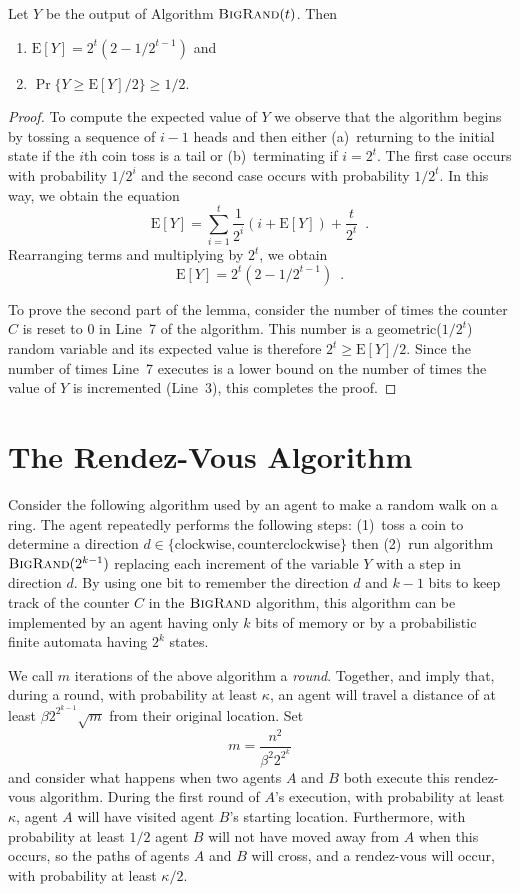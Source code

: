 \documentclass[lotsofwhite]{patmorin}
\newcommand{\bigrand}{\textsc{BigRand}}
\newcommand{\E}{\mathrm{E}}
\begin{document}
\begin{lem}
Let $Y$ be the output of Algorithm $\bigrand(t)$.  Then 
\begin{enumerate}
\item $\E[Y]=2^t(2-1/2^{t-1})$ and
\item $\Pr\{Y \ge \E[Y] / 2\} \ge 1/2$.
\end{enumerate}
\end{lem}

\begin{proof}
To compute the expected value of $Y$ we observe that the algorithm
begins by tossing a sequence of $i-1$ heads and then either
(a)~returning to the initial state if the $i$th coin toss is a tail
or (b)~terminating if $i=2^t$.  The first case occurs with probability
$1/2^i$ and the second case occurs with probability $1/2^t$.
In this way, we obtain the equation
\[
   \E[Y] = \sum_{i=1}^{t} \frac{1}{2^i}\left(i + \E[Y]\right) +
\frac{t}{2^t} \enspace .
\]
Rearranging terms and multiplying by $2^{t}$, we obtain
\[
   \E[Y] = 2^t(2-1/2^{t-1}) \enspace .  
\]

To prove the second part of the lemma, consider the number of times
the counter $C$ is reset to $0$ in Line~7 of the algorithm.  This
number is a geometric($1/2^t$) random variable and its expected value
is therefore $2^t \ge \E[Y]/2$.  Since the number of times Line~7
executes is a lower bound on the number of times the value of $Y$ is
incremented (Line~3), this completes the proof.
\end{proof}

\section{The Rendez-Vous Algorithm}

Consider the following algorithm used by an agent to make a random
walk on a ring.  The agent repeatedly performs the following steps:
(1)~toss a coin to determine a direction
$d\in\{\mbox{clockwise},\mbox{counterclockwise}\}$ then (2)~run
algorithm $\bigrand(2^{k-1})$ replacing each increment of the variable
$Y$ with a step in direction $d$. By using one bit to remember the
direction $d$ and $k-1$ bits to keep track of the counter $C$ in the
$\bigrand$ algorithm, this algorithm can be implemented by an agent
having only $k$ bits of memory or by a probabilistic finite automata
having $2^{k}$ states.

We call $m$ iterations of the above algorithm a \emph{round}.
Together,  and  imply that, during a
round, with probability at least $\kappa$, an agent will travel a
distance of at least $\beta 2^{2^{k-1}}\sqrt{m}$ from their original
location.  Set
\[
   m= \frac{n^2}{\beta^2 2^{2^k}}  
\]
and consider what happens when two agents $A$ and $B$ both execute
this rendez-vous algorithm.  During the first round of $A$'s
execution, with probability at least $\kappa$, agent $A$ will have
visited agent $B$'s starting location. Furthermore, with probability
at least $1/2$ agent $B$ will not have moved away from $A$ when this
occurs, so the paths of agents $A$ and $B$ will cross, and a
rendez-vous will occur, with probability at least $\kappa/2$.
\end{document}
